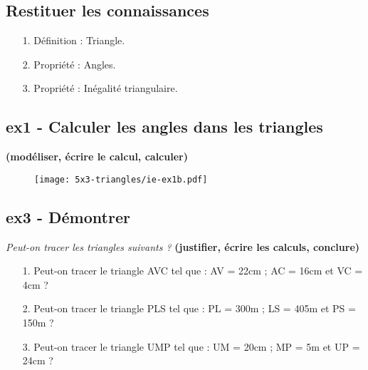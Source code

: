 \subsection*{Restituer les connaissances}

\begin{enumerate}
  \item[1.] Définition : Triangle. \newline \Pointilles[1]
  \item[2.] Propriété : Angles. \newline \Pointilles[1]
  \item[3.] Propriété : Inégalité triangulaire. \newline \Pointilles[1]
\end{enumerate}

\subsection*{ex1 - Calculer les angles dans les triangles}
\textbf{(modéliser, écrire le calcul, calculer)}

\begin{figure}[H]
  \centering
  \texttt{[image: 5x3-triangles/ie-ex1b.pdf]}
\end{figure}

\begin{multicols}{4}
\Pointilles[3] 
\columnbreak 

\Pointilles[3] 
\columnbreak 

\Pointilles[3] 
\columnbreak 

\Pointilles[3] 
\columnbreak 
\end{multicols}


\subsection*{ex3 - Démontrer}
\textit{Peut-on tracer les triangles suivants ?}
\textbf{(justifier, écrire les calculs, conclure)}

\begin{enumerate}
  \item[1.] Peut-on tracer le triangle AVC tel que : AV = 22cm ; AC = 16cm et VC = 4cm ? 
  \item[2.] Peut-on tracer le triangle PLS tel que : PL = 300m ; LS = 405m et PS = 150m ? 
  \item[3.] Peut-on tracer le triangle UMP tel que : UM = 20cm ; MP = 5m et UP = 24cm ?  
\end{enumerate} 

